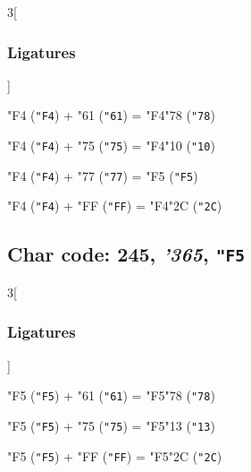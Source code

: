 \documentclass{article}
\newlength{\maxcharwidth}
\begin{document}
\begin{multicols}{3}[\subsubsection{Ligatures}]

{\testfont\char"F4\noboundary} ({\tt"F4}) + {\testfont\char"61\noboundary} ({\tt"61}) = {\testfont\char"F4\noboundary}{\testfont\char"78\noboundary} ({\tt"78}) 

{\testfont\char"F4\noboundary} ({\tt"F4}) + {\testfont\char"75\noboundary} ({\tt"75}) = {\testfont\char"F4\noboundary}{\testfont\char"10\noboundary} ({\tt"10}) 

{\testfont\char"F4\noboundary} ({\tt"F4}) + {\testfont\char"77\noboundary} ({\tt"77}) = {\testfont\char"F5\noboundary} ({\tt"F5}) 

{\testfont\char"F4\noboundary} ({\tt"F4}) + {\testfont\char"FF\noboundary} ({\tt"FF}) = {\testfont\char"F4\noboundary}{\testfont\char"2C\noboundary} ({\tt"2C}) 

\end{multicols}

\subsection{Char code: 245, {\it'365}, {\tt"F5}}
\label{char_245}


\begin{multicols}{3}[\subsubsection{Ligatures}]

{\testfont\char"F5\noboundary} ({\tt"F5}) + {\testfont\char"61\noboundary} ({\tt"61}) = {\testfont\char"F5\noboundary}{\testfont\char"78\noboundary} ({\tt"78}) 

{\testfont\char"F5\noboundary} ({\tt"F5}) + {\testfont\char"75\noboundary} ({\tt"75}) = {\testfont\char"F5\noboundary}{\testfont\char"13\noboundary} ({\tt"13}) 

{\testfont\char"F5\noboundary} ({\tt"F5}) + {\testfont\char"FF\noboundary} ({\tt"FF}) = {\testfont\char"F5\noboundary}{\testfont\char"2C\noboundary} ({\tt"2C}) 

\end{multicols}
\end{document}
